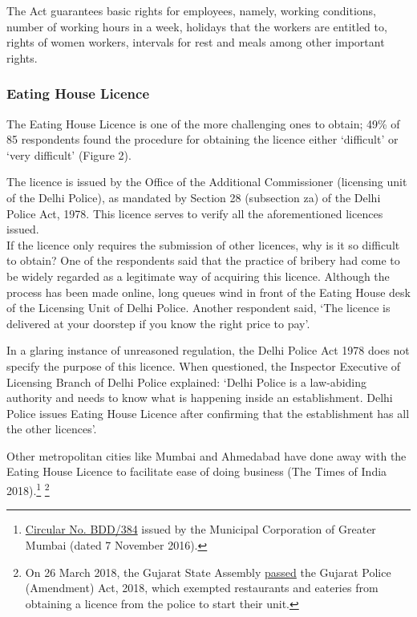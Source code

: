 \documentclass[a4paper, 12pt]{article}
\begin{document}
                   The Act guarantees basic rights for employees, namely, working conditions, number of working hours in a week, holidays that the workers are entitled to, rights of women workers, intervals for rest and meals among other important rights.
         
         
                   \subsubsection{Eating House Licence}
                   The Eating House Licence is one of the more challenging ones to obtain; 49\% of 85 respondents found the procedure for obtaining the licence either ‘difficult’ or ‘very difficult’ (Figure 2).
                   
                   The licence is issued by the Office of the Additional Commissioner (licensing unit of the Delhi Police), as mandated by Section 28 (subsection za) of the Delhi Police Act, 1978. This licence serves to verify all the aforementioned licences issued.\\
                   If the licence only requires the submission of other licences, why is it so difficult to obtain? One of the respondents said that the practice of bribery had come to be widely regarded as a legitimate way of acquiring this licence. Although the process has 
been made online, long queues wind in front of the Eating House desk of the Licensing Unit of Delhi Police. Another respondent said, ‘The licence is delivered at your doorstep if you know the right price to pay’.
                   
                   In a glaring instance of unreasoned regulation, the Delhi Police Act 1978 does not specify the purpose of this licence. When questioned, the Inspector Executive of Licensing Branch of Delhi Police explained: ‘Delhi Police is a law-abiding authority and 
needs to know what is happening inside an establishment. Delhi Police issues Eating House Licence after confirming that the establishment has all the other licences’.
                   
                   Other metropolitan cities like Mumbai and Ahmedabad have done away with the Eating House Licence to facilitate ease of doing business (The Times of India 2018).\footnote{\href{https://bit.ly/2xiMwpL}{Circular No. BDD/384} issued by the Municipal 
Corporation of Greater Mumbai (dated 7 November 2016).} \footnote{On 26 March 2018, the Gujarat State Assembly \href{https://bit.ly/2xktGyu}{passed} the Gujarat Police (Amendment) Act, 2018, which exempted restaurants and eateries from obtaining a licence 
from the police to start their unit.} %
                   
\end{document}
